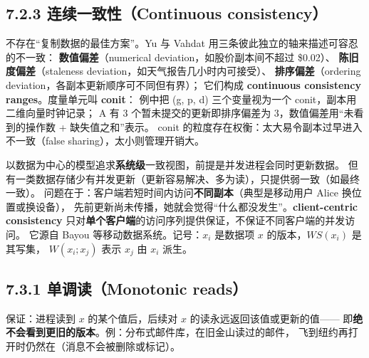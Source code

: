 \begin{closeread}
\end{closeread}


\subsection*{7.2.3 连续一致性（Continuous consistency）}
不存在“复制数据的最佳方案”。Yu 与 Vahdat 用三条彼此独立的轴来描述可容忍的不一致：
\textbf{数值偏差}（numerical deviation，如股价副本间不超过 \$0.02）、
\textbf{陈旧度偏差}（staleness deviation，如天气报告几小时内可接受）、
\textbf{排序偏差}（ordering deviation，各副本更新顺序可不同但有界）；
它们构成 \textbf{continuous consistency ranges}。度量单元叫 \textbf{conit}：
例中把 (g, p, d) 三个变量视为一个 conit，副本用二维向量时钟记录；
A 有 3 个暂未提交的更新即排序偏差为 3，数值偏差用“未看到的操作数 + 缺失值之和”表示。
conit 的粒度存在权衡：太大易令副本过早进入不一致（false sharing），太小则管理开销大。

\begin{closeread}
\end{closeread}



以数据为中心的模型追求\textbf{系统级}一致视图，前提是并发进程会同时更新数据。
但有一类数据存储少有并发更新（更新容易解决、多为读），只提供弱一致（如最终一致）。
问题在于：客户端若短时间内访问\textbf{不同副本}（典型是移动用户 Alice 换位置或换设备），
先前更新尚未传播，她就会觉得“什么都没发生”。\textbf{client-centric consistency}
只对\textbf{单个客户端}的访问序列提供保证，不保证不同客户端的并发访问。
它源自 Bayou 等移动数据系统。记号：$x_i$ 是数据项 $x$ 的版本，$WS(x_i)$ 是其写集，
$W(x_i; x_j)$ 表示 $x_j$ 由 $x_i$ 派生。

\subsection*{7.3.1 单调读（Monotonic reads）}
保证：进程读到 $x$ 的某个值后，后续对 $x$ 的读永远返回该值或更新的值——
即\textbf{绝不会看到更旧的版本}。例：分布式邮件库，在旧金山读过的邮件，
飞到纽约再打开时仍然在（消息不会被删除或标记）。

